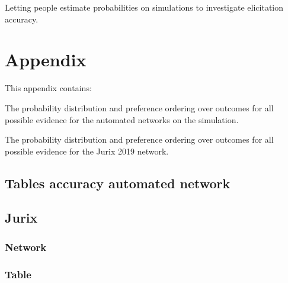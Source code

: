 \documentclass[12pt]{article}
\begin{document}
Letting people estimate probabilities on simulations to investigate elicitation accuracy.

\newpage



\newpage
\section*{Appendix}

This appendix contains:

The probability distribution and preference ordering over outcomes for all possible evidence for the automated networks on the simulation.

The probability distribution and preference ordering over outcomes for all possible evidence for the Jurix 2019 network.

\newpage
\subsection{Tables accuracy automated network}
%
\newpage



\subsection{Jurix}
\subsubsection{Network}


\subsubsection{Table}
%
\end{document}

